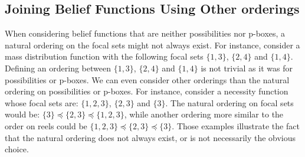 \subsection{Joining Belief Functions Using Other orderings}\label{sec:other_orders}
When considering belief functions that are neither possibilities nor p-boxes, a natural ordering on the focal sets might not always exist. For instance, consider a mass distribution function with the following focal sets $\{1,3\}$, $\{2,4\}$ and $\{1,4\}$. Defining an ordering between $\{1,3\}$, $\{2,4\}$ and $\{1,4\}$ is not trivial as it was for possibilities or p-boxes. We can even consider other orderings than the natural ordering on possibilities or p-boxes. For instance, consider a necessity function whose focal sets are: $\{1,2,3\}$, $\{2,3\}$ and $\{3\}$. The natural ordering on focal sets would be: $\{3\}\preceq\{2,3\}\preceq\{1,2,3\}$, while another ordering more similar to the order on reels could be $\{1,2,3\}\preceq\{2,3\}\preceq\{3\}$. Those examples illustrate the fact that the natural ordering does not always exist, or is not necessarily the obvious choice. 

